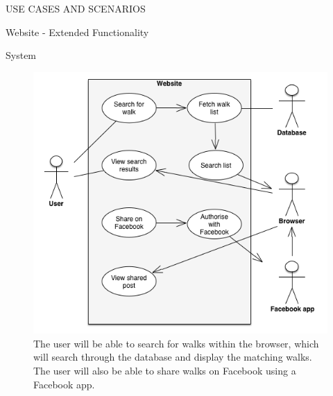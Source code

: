 \documentclass{article}
\begin{document}
\begin{section}{USE CASES AND SCENARIOS}
		\clearpage
		\begin{subsection}{Website - Extended Functionality}
			\begin{subsubsection}{System}
				\begin{figure}[h!]
					\begin{center}
						\includegraphics[height=0.75\columnwidth]{./Diagrams/UseCase/Website/Extended/Website.png}
					\end{center}
					\caption{The user will be able to search for walks within the browser, which will search through the database and display the matching walks. The user will also be able to share walks on Facebook using a Facebook app.}
				\end{figure}
			\end{subsubsection}
		\end{subsection}
	\end{section}
	
\end{document}

